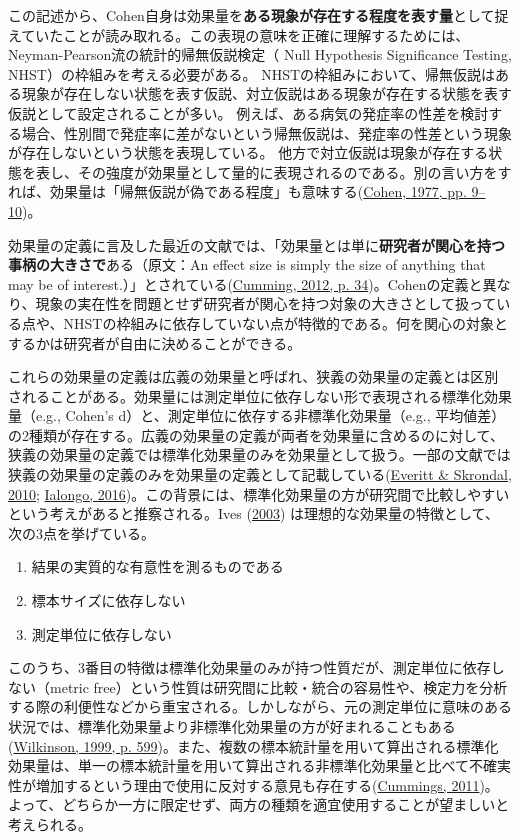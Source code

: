 \documentclass[
  ja=standard, xelatex, base=12pt]{bxjsreport}
\providecommand{\tightlist}{%
  \setlength{\itemsep}{0pt}\setlength{\parskip}{0pt}}
\begin{document}
この記述から、Cohen自身は効果量を\textbf{ある現象が存在する程度を表す量}として捉えていたことが読み取れる。この表現の意味を正確に理解するためには、Neyman-Pearson流の統計的帰無仮説検定（ Null Hypothesis Significance Testing, NHST）の枠組みを考える必要がある。 NHSTの枠組みにおいて、帰無仮説はある現象が存在しない状態を表す仮説、対立仮説はある現象が存在する状態を表す仮説として設定されることが多い。 例えば、ある病気の発症率の性差を検討する場合、性別間で発症率に差がないという帰無仮説は、発症率の性差という現象が存在しないという状態を表現している。 他方で対立仮説は現象が存在する状態を表し、その強度が効果量として量的に表現されるのである。別の言い方をすれば、効果量は「帰無仮説が偽である程度」も意味する(\protect\hyperlink{ref-cohen1977statistical}{Cohen, 1977, pp. 9--10})。

効果量の定義に言及した最近の文献では、「効果量とは単に\textbf{研究者が関心を持つ事柄の大きさで}ある（原文：An effect size is simply the size of anything that may be of interest.）」とされている(\protect\hyperlink{ref-cumming2012understanding}{Cumming, 2012, p. 34})。Cohenの定義と異なり、現象の実在性を問題とせず研究者が関心を持つ対象の大きさとして扱っている点や、NHSTの枠組みに依存していない点が特徴的である。何を関心の対象とするかは研究者が自由に決めることができる。

これらの効果量の定義は広義の効果量と呼ばれ、狭義の効果量の定義とは区別されることがある。効果量には測定単位に依存しない形で表現される標準化効果量（e.g., Cohen's d）と、測定単位に依存する非標準化効果量（e.g., 平均値差）の2種類が存在する。広義の効果量の定義が両者を効果量に含めるのに対して、狭義の効果量の定義では標準化効果量のみを効果量として扱う。一部の文献では狭義の効果量の定義のみを効果量の定義として記載している(\protect\hyperlink{ref-everitt2010cambridge}{Everitt \& Skrondal, 2010}; \protect\hyperlink{ref-ialongo2016}{Ialongo, 2016})。この背景には、標準化効果量の方が研究間で比較しやすいという考えがあると推察される。Ives (\protect\hyperlink{ref-ives2003}{2003}) は理想的な効果量の特徴として、次の3点を挙げている。

\begin{enumerate}
\def\labelenumi{\arabic{enumi}.}
\tightlist
\item
  結果の実質的な有意性を測るものである
\item
  標本サイズに依存しない
\item
  測定単位に依存しない
\end{enumerate}

このうち、3番目の特徴は標準化効果量のみが持つ性質だが、測定単位に依存しない（metric free）という性質は研究間に比較・統合の容易性や、検定力を分析する際の利便性などから重宝される。しかしながら、元の測定単位に意味のある状況では、標準化効果量より非標準化効果量の方が好まれることもある(\protect\hyperlink{ref-wilkinson1999}{Wilkinson, 1999, p. 599})。また、複数の標本統計量を用いて算出される標準化効果量は、単一の標本統計量を用いて算出される非標準化効果量と比べて不確実性が増加するという理由で使用に反対する意見も存在する(\protect\hyperlink{ref-cummings2011}{Cummings, 2011})。 よって、どちらか一方に限定せず、両方の種類を適宜使用することが望ましいと考えられる。
\end{document}
